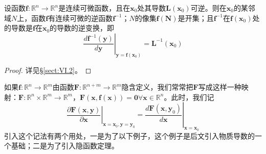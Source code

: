 \documentclass[main.tex]{subfiles}
\begin{document}
\begin{theorem}[反函数定理] 
设函数$\mathbf{f}:\mathbb{R}^n\rightarrow\mathbb{R}^n$是连续可微函数，且在$\mathbf{x}_0$处其导数$\mathbf{L}\left(\mathbf{x}_0\right)$可逆。则在$\mathbf{x}_0$的某邻域$N$上，函数$\mathbf{f}$有连续可微的逆函数$\mathbf{f}^{-1}$；$N$的像集$\mathbf{f}\left(\mathbf{N}\right)$是开集；且$\mathbf{f}^{-1}$在$\mathbf{f}\left(\mathbf{x}_0\right)$处的导数是$\mathbf{f}$在$\mathbf{x}_0$的导数的逆变换，即
\[\left.\frac{d\mathbf{f}^{-1}\left(\mathbf{y}\right)}{d\mathbf{y}}\right|_{\mathbf{y}=\mathbf{f}\left(\mathbf{x}_0\right)}=\mathbf{L}^{-1}\left(\mathbf{x}_0\right)\]
\end{theorem}
\begin{proof}
详见\S\ref{sect:VI.2}。
\end{proof}

如果$\mathbf{f}:\mathbb{R}^n\rightarrow\mathbb{R}^m$由函数$\mathbf{F}:\mathbb{R}^{n+m}\rightarrow\mathbb{R}^m$隐含定义，我们常常把$\mathbf{F}$写成这样一种映射：$\mathbf{F}:\mathbb{R}^n\times\mathbb{R}^m\rightarrow\mathbb{R}^m$，$\mathbf{F}\left(\mathbf{x},\mathbf{f}\left(\mathbf{x}\right)\right)=\mathbf{0}\forall\mathbf{x}\in\mathbb{R}^n$。此时，我们记
\[\left.\frac{\partial \mathbf{F}\left(\mathbf{x},\mathbf{y}\right)}{\partial \mathbf{x}}\right|_{\mathbf{x}=\mathbf{x}_0,\mathbf{y}=\mathbf{y}_0}=\left.\frac{d\mathbf{F}\left(\mathbf{x},\mathbf{y}_0\right)}{d\mathbf{x}}\right|_{\mathbf{x}=\mathbf{x}_0}\]
引入这个记法有两个用处，一是为了以下例子，这个例子是后文引入物质导数的一个基础；二是为了引入隐函数定理。
\end{document}
